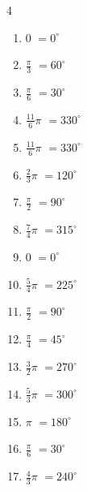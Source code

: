 \begin{multicols}{4}
\begin{enumerate}
  \item $\displaystyle 0$
        $\displaystyle =0^{\circ}$

  \item $\displaystyle \frac{\pi}{3}$
        $\displaystyle =60^{\circ}$

  \item $\displaystyle \frac{\pi}{6}$
        $\displaystyle =30^{\circ}$

  \item $\displaystyle \frac{11}{6}\pi$
        $\displaystyle =330^{\circ}$

  \item $\displaystyle \frac{11}{6}\pi$
        $\displaystyle =330^{\circ}$

  \item $\displaystyle \frac{2}{3}\pi$
        $\displaystyle =120^{\circ}$

  \item $\displaystyle \frac{\pi}{2}$
        $\displaystyle =90^{\circ}$

  \item $\displaystyle \frac{7}{4}\pi$
        $\displaystyle =315^{\circ}$

  \item $\displaystyle 0$
        $\displaystyle =0^{\circ}$

  \item $\displaystyle \frac{5}{4}\pi$
        $\displaystyle =225^{\circ}$

  \item $\displaystyle \frac{\pi}{2}$
        $\displaystyle =90^{\circ}$

  \item $\displaystyle \frac{\pi}{4}$
        $\displaystyle =45^{\circ}$

  \item $\displaystyle \frac{3}{2}\pi$
        $\displaystyle =270^{\circ}$

  \item $\displaystyle \frac{5}{3}\pi$
        $\displaystyle =300^{\circ}$

  \item $\displaystyle \pi$
        $\displaystyle =180^{\circ}$

  \item $\displaystyle \frac{\pi}{6}$
        $\displaystyle =30^{\circ}$

  \item $\displaystyle \frac{4}{3}\pi$
        $\displaystyle =240^{\circ}$


\end{enumerate}
\end{multicols}
